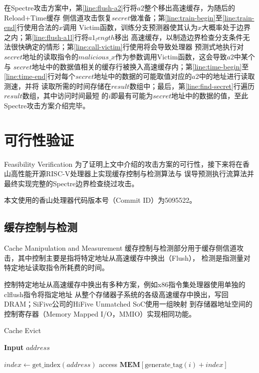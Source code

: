 在Spectre攻击方案中，第\ref{line:flush-a2}行将$a2$整个移出高速缓存，为随后的Reload+Time缓存
侧信道攻击恢复$secret$做准备；第\ref{line:train-begin}至\ref{line:train-end}行使用合法的$x$调用
Victim函数，训练分支预测器使其认为$x$大概率处于边界之内；第\ref{line:flush-a1l}行将$a1_length$移出
高速缓存，以制造边界检查分支条件无法很快确定的情形；第\ref{line:call-victim}行使用将会导致处理器
预测式地执行对$secret$地址的读取指令的$malicious\_x$作为参数调用Victim函数，这会导致$a2$中某个与
$secret$地址中的数据值相关的缓存行被换入高速缓存内；第\ref{line:time-begin}至
\ref{line:time-end}行对每个$secret$地址中的数据的可能取值对应的$a2$中的地址进行读取测速，并将
读取所需的时间存储在$result$数组中；最后，第\ref{line:find-secret}行遍历$result$数组，其中访问时间最短
的$i$即最有可能为$secret$地址中的数据的值，至此Spectre攻击方案介绍完毕。

\section{可行性验证}{Feasibility Verification}
为了证明上文中介绍的攻击方案的可行性，接下来将在香山高性能开源RISC-V处理器上实现缓存控制与检测算法与
误导预测执行流算法并最终实现完整的Spectre边界检查绕过攻击。

本文使用的香山处理器代码版本号（Commit ID）为5095522。

\subsection{缓存控制与检测}{Cache Manipulation and Measurement}
缓存控制与检测部分用于缓存侧信道攻击，其中控制主要是指将特定地址从高速缓存中换出（Flush），
检测是指测量对特定地址读取指令所耗费的时间。

控制特定地址从高速缓存中换出有多种方案，例如x86指令集处理器使用单独的clflush指令将指定地址
从整个存储器子系统的各级高速缓存中换出，写回DRAM；SiFive公司的HiFive Unmatched SoC使用一组映射
到存储器地址空间的控制寄存器（Memory Mapped I/O，MMIO）实现相同功能。

\begin{algorithm}
	\caption{Cache Evict}\label{algo:cache-evict}
	\hspace*{\algorithmicindent} \textbf{Input} $address$
	\begin{algorithmic}[1]
			\State $index \gets \text{get\_index}(address)$
				\State access $\textbf{MEM}[\text{generate\_tag}(i) + index]$
		  	\EndFor
		\EndFunction
	\end{algorithmic}
\end{algorithm}


